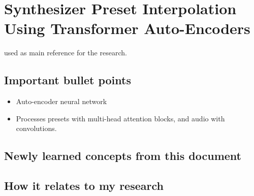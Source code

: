 \section{Synthesizer Preset Interpolation Using Transformer Auto-Encoders}

\cite{SPINVAE1} used as main reference for the research.

\subsection{Important bullet points}

\begin{itemize}
    \item Auto-encoder neural network 
    \item Processes presets with multi-head attention blocks, and audio with convolutions.
\end{itemize}

\subsection{Newly learned concepts from this document}

\subsection{How it relates to my research}